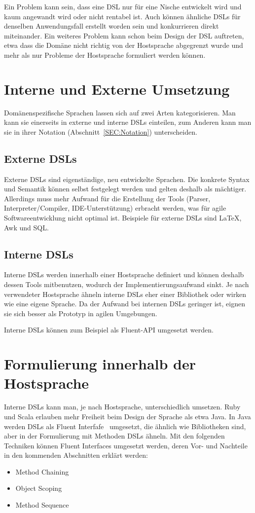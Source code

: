 \documentclass[../InterneDSLs.tex]{subfiles}
\begin{document}
Ein Problem kann sein, dass eine DSL nur für eine Nische entwickelt wird und kaum angewandt wird oder nicht rentabel ist. Auch können ähnliche DSLs für denselben Anwendungsfall erstellt worden sein und konkurrieren direkt miteinander. Ein weiteres Problem kann schon beim Design der DSL auftreten, etwa dass die Domäne nicht richtig von der Hostsprache abgegrenzt wurde und mehr als nur Probleme der Hostsprache formuliert werden können.


\section{Interne und Externe Umsetzung}
Domänenspezifische Sprachen lassen sich auf zwei Arten kategorisieren. Man kann sie einerseits in externe und interne DSLs einteilen, zum Anderen kann man sie in ihrer Notation (Abschnitt~\ref{SEC:Notation}) unterscheiden.

\subsection{Externe DSLs}
Externe DSLs sind eigenständige, neu entwickelte Sprachen. Die konkrete Syntax und Semantik können selbst festgelegt werden und gelten deshalb als mächtiger. Allerdings muss mehr Aufwand für die Erstellung der Tools (Parser, Interpreter/Compiler, \acs{IDE}-Unterstützung) erbracht werden, was für agile Softwareentwicklung nicht optimal ist. Beispiele für externe DSLs sind LaTeX, Awk und SQL.

\subsection{Interne DSLs}
Interne DSLs werden innerhalb einer Hostsprache definiert und können deshalb dessen Tools mitbenutzen, wodurch der Implementierungsaufwand sinkt. Je nach verwendeter Hostsprache ähneln interne DSLs eher einer Bibliothek oder wirken wie eine eigene Sprache. Da der Aufwand bei internen DSLs geringer ist, eignen sie sich besser als Prototyp in agilen Umgebungen.~\cite{butting2018deriving}

Interne DSLs können zum Beispiel als Fluent-\acs{API} umgesetzt werden.


\section{Formulierung innerhalb der Hostsprache}
Interne DSLs kann man, je nach Hostsprache, unterschiedlich umsetzen. Ruby und Scala erlauben mehr Freiheit beim Design der Sprache als etwa Java. In Java werden DSLs als Fluent Interfafe~\cite{FluentInterface.Wikipedia} umgesetzt, die ähnlich wie Bibliotheken sind, aber in der Formulierung mit Methoden DSLs ähneln. Mit den folgenden Techniken können Fluent Interfaces umgesetzt werden, deren Vor- und Nachteile in den kommenden Abschnitten erklärt werden:
\begin{itemize}
	\item Method Chaining
	\item Object Scoping
	\item Method Sequence
\end{itemize}
\end{document}

